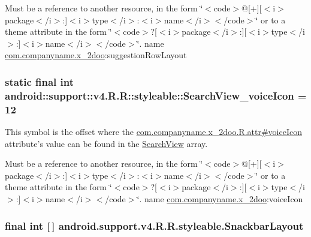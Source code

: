Must be a reference to another resource, in the form \char`\"{}$<$code$>$@\mbox{[}+\mbox{]}\mbox{[}$<$i$>$package$<$/i$>$:\mbox{]}$<$i$>$type$<$/i$>$:$<$i$>$name$<$/i$>$$<$/code$>$\char`\"{} or to a theme attribute in the form \char`\"{}$<$code$>$?\mbox{[}$<$i$>$package$<$/i$>$:\mbox{]}\mbox{[}$<$i$>$type$<$/i$>$:\mbox{]}$<$i$>$name$<$/i$>$$<$/code$>$\char`\"{}.  name \hyperlink{namespacecom_1_1companyname_1_1x__2doo}{com.companyname.x\_\-2doo}:suggestionRowLayout \hypertarget{classandroid_1_1support_1_1v4_1_1_r_1_1styleable_9e4c859282f5e9607d3b5ed4f4748148}{
\subsubsection[{SearchView\_\-voiceIcon}]{\setlength{\rightskip}{0pt plus 5cm}static final int android::support::v4.R.R::styleable::SearchView\_\-voiceIcon = 12}}
\label{classandroid_1_1support_1_1v4_1_1_r_1_1styleable_9e4c859282f5e9607d3b5ed4f4748148}


This symbol is the offset where the \hyperlink{classcom_1_1companyname_1_1x__2doo_1_1_r_1_1attr_ee7d698d776fc746f308cf5eba381f11}{com.companyname.x\_\-2doo.R.attr\#voiceIcon} attribute's value can be found in the \hyperlink{classandroid_1_1support_1_1v4_1_1_r_1_1styleable_63a589da97c59fb7eebd9759edb31f0d}{SearchView} array.

Must be a reference to another resource, in the form \char`\"{}$<$code$>$@\mbox{[}+\mbox{]}\mbox{[}$<$i$>$package$<$/i$>$:\mbox{]}$<$i$>$type$<$/i$>$:$<$i$>$name$<$/i$>$$<$/code$>$\char`\"{} or to a theme attribute in the form \char`\"{}$<$code$>$?\mbox{[}$<$i$>$package$<$/i$>$:\mbox{]}\mbox{[}$<$i$>$type$<$/i$>$:\mbox{]}$<$i$>$name$<$/i$>$$<$/code$>$\char`\"{}.  name \hyperlink{namespacecom_1_1companyname_1_1x__2doo}{com.companyname.x\_\-2doo}:voiceIcon \hypertarget{classandroid_1_1support_1_1v4_1_1_r_1_1styleable_f3b816b2bb4147ee0c0cb792ff6d7454}{
\subsubsection[{SnackbarLayout}]{\setlength{\rightskip}{0pt plus 5cm}final int \mbox{[}$\,$\mbox{]} android.support.v4.R.R.styleable.SnackbarLayout}}
\label{classandroid_1_1support_1_1v4_1_1_r_1_1styleable_f3b816b2bb4147ee0c0cb792ff6d7454}


